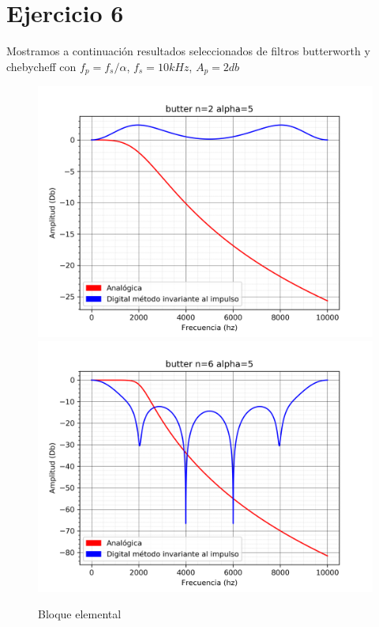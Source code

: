 \documentclass[assd_tp3_main.tex]{subfiles}
\begin{document}
\section{Ejercicio 6}
Mostramos a continuación resultados seleccionados de filtros butterworth y chebycheff con
$f_p=f_s/\alpha$, $f_s=10kHz$, $A_p=2db$

\begin{figure}[H]	
	\centering
	\includegraphics[scale=1]{output/butter/alpha=5/butter_n=2.png}
	\includegraphics[scale=1]{output/butter/alpha=5/butter_n=6.png}
	\caption{Bloque elemental}
	\label{fig:bloqueElemental}
\end{figure}
\end{document}

